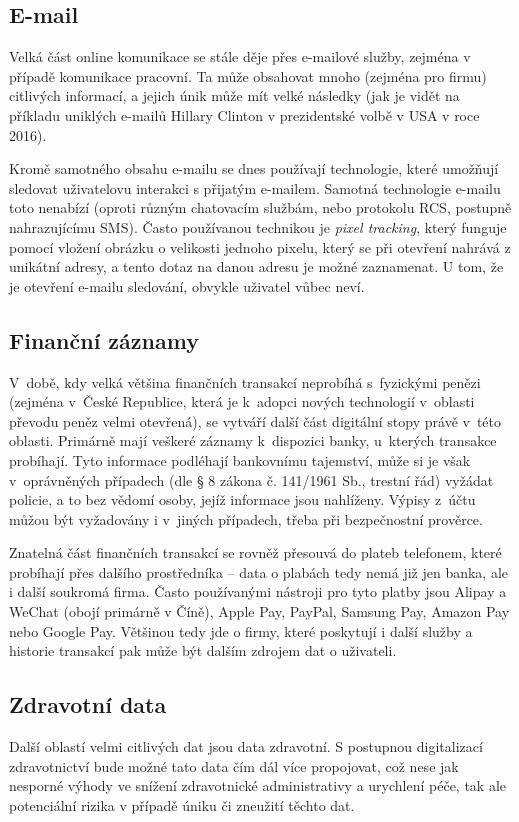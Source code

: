 \subsection{E-mail}
Velká část online komunikace se stále děje přes e-mailové služby, zejména v případě komunikace pracovní. Ta může obsahovat mnoho (zejména pro firmu) citlivých informací, a jejich únik může mít velké následky (jak je vidět na příkladu uniklých e-mailů Hillary Clinton v prezidentské volbě v USA v roce 2016).

Kromě samotného obsahu e-mailu se dnes používají technologie, které umožňují sledovat uživatelovu interakci s přijatým e-mailem. Samotná technologie e-mailu toto nenabízí (oproti různým chatovacím službám, nebo protokolu RCS, postupně nahrazujícímu SMS). Často používanou technikou je \textit{pixel tracking}, který funguje pomocí vložení  obrázku o velikosti jednoho pixelu, který se při otevření nahrává z unikátní adresy, a tento dotaz na danou adresu je možné zaznamenat. U tom, že je otevření e-mailu sledování, obvykle uživatel vůbec neví.

\subsection{Finanční záznamy}
V~době, kdy velká většina finančních transakcí neprobíhá s~fyzickými penězi (zejména v~České Republice, která je k~adopci nových technologií v~oblasti převodu peněz velmi otevřená), se vytváří další část digitální stopy právě v~této oblasti.
Primárně mají veškeré záznamy k~dispozici banky, u~kterých transakce probíhají. Tyto informace podléhají bankovnímu tajemství, může si je však v~oprávněných případech (dle § 8 zákona č. 141/1961 Sb., trestní řád) vyžádat policie, a to bez vědomí osoby, jejíž informace jsou nahlíženy. Výpisy z~účtu můžou být vyžadovány i v~jiných případech, třeba při bezpečnostní prověrce.

Znatelná část finančních transakcí se rovněž přesouvá do plateb telefonem, které probíhají přes dalšího prostředníka -- data o plabách tedy nemá již jen banka, ale i další soukromá firma. Často používanými nástroji pro tyto platby jsou Alipay a WeChat (obojí primárně v Číně), Apple Pay, PayPal, Samsung Pay, Amazon Pay nebo Google Pay. Většinou tedy jde o firmy, které poskytují i další služby a historie transakcí pak může být dalším zdrojem dat o uživateli.

\subsection{Zdravotní data}
Další oblastí velmi citlivých dat jsou data zdravotní. S postupnou digitalizací zdravotnictví bude možné tato data čím dál více propojovat, což nese jak nesporné výhody ve snížení zdravotnické administrativy a urychlení péče, tak ale potenciální rizika v případě úniku či zneužití těchto dat.

